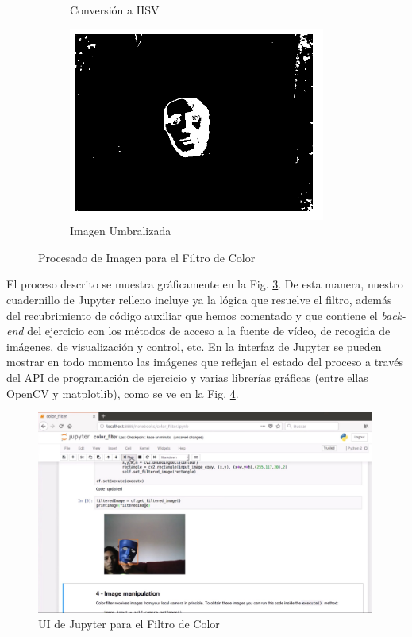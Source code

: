 \begin{figure}
\begin{subfigure}{.32\textwidth}
  \caption{Conversión a HSV}
  \label{hsv}
\end{subfigure}
\begin{subfigure}{.32\textwidth}
  \centering
  \includegraphics[width=.95\linewidth]{figures/cf_mask.png}
  \caption{Imagen Umbralizada}
  \label{mask}
\end{subfigure}
\caption{Procesado de Imagen para el Filtro de Color}
\label{procesado}
\end{figure}

El proceso descrito se muestra gráficamente en la Fig. \ref{procesado}. De esta manera, nuestro cuadernillo de Jupyter relleno incluye ya la lógica que resuelve el filtro, además del recubrimiento de código auxiliar que hemos comentado y que contiene el \textit{back-end} del ejercicio con los métodos de acceso a la fuente de vídeo, de recogida de imágenes, de visualización y control, etc. En la interfaz de Jupyter se pueden mostrar en todo momento las imágenes que reflejan el estado del proceso a través del API de programación de ejercicio y varias librerías gráficas (entre ellas OpenCV y matplotlib), como se ve en la Fig. \ref{ui_cf_jupyter}.

\begin{figure}[!hbtp]  \centering\noindent
    \includegraphics[width=0.99\textwidth]{figures/ui_cf_jupyter.jpg}
    \caption{UI de Jupyter para el Filtro de Color}
    \label{ui_cf_jupyter}
\end{figure}


